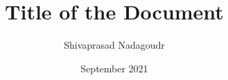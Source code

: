 \documentclass[mtech,thesis]{iist}
\title{Title of the Document}
\author{Shivaprasad Nadagoudr}
\date{September 2021}
\begin{document}
\maketitle %
\makecertificate %
\makedeclaration %
\makededication %
\makeacknowledgements %
\makeabstract %
\maketableofcontents %
\makelistoffigures %
\makelistoftables %
\makelistofalgorithms %
\makeabbreviations %
\makenomenclature %

\makechaptersettings 








\makebibsettings



\makepublications

\makeappendixsettings



\makeindexsettings
\end{document}
